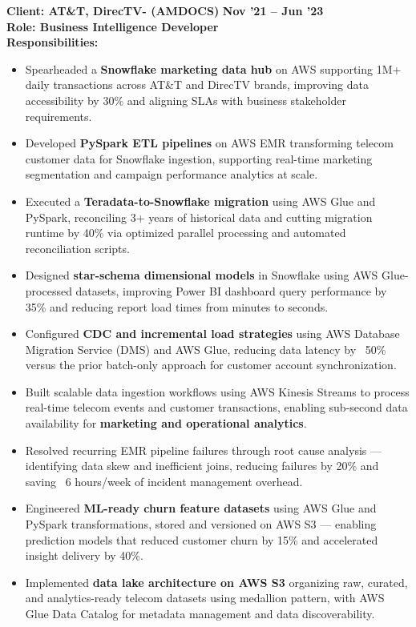 \documentclass[a4paper,10pt]{article}
\begin{document}
\vspace{0.5cm}
\textbf{Client: AT\&T, DirecTV- (AMDOCS)} \hfill \textbf{Nov '21 – Jun '23} \\
\textbf{Role: Business Intelligence Developer} \\
\textbf{Responsibilities:}
\begin{itemize}
    \item Spearheaded a \textbf{Snowflake marketing data hub} on AWS supporting 1M+ daily transactions across AT\&T and DirecTV brands, improving data accessibility by 30\% and aligning SLAs with business stakeholder requirements.
    \item Developed \textbf{PySpark ETL pipelines} on AWS EMR transforming telecom customer data for Snowflake ingestion, supporting real-time marketing segmentation and campaign performance analytics at scale.
    \item Executed a \textbf{Teradata-to-Snowflake migration} using AWS Glue and PySpark, reconciling 3+ years of historical data and cutting migration runtime by 40\% via optimized parallel processing and automated reconciliation scripts.
    \item Designed \textbf{star-schema dimensional models} in Snowflake using AWS Glue-processed datasets, improving Power BI dashboard query performance by 35\% and reducing report load times from minutes to seconds.
    \item Configured \textbf{CDC and incremental load strategies} using AWS Database Migration Service (DMS) and AWS Glue, reducing data latency by ~50\% versus the prior batch-only approach for customer account synchronization.
    \item Built scalable data ingestion workflows using AWS Kinesis Streams to process real-time telecom events and customer transactions, enabling sub-second data availability for \textbf{marketing and operational analytics}.
    \item Resolved recurring EMR pipeline failures through root cause analysis — identifying data skew and inefficient joins, reducing failures by 20\% and saving ~6 hours/week of incident management overhead.
    \item Engineered \textbf{ML-ready churn feature datasets} using AWS Glue and PySpark transformations, stored and versioned on AWS S3 — enabling prediction models that reduced customer churn by 15\% and accelerated insight delivery by 40\%.
    \item Implemented \textbf{data lake architecture on AWS S3} organizing raw, curated, and analytics-ready telecom datasets using medallion pattern, with AWS Glue Data Catalog for metadata management and data discoverability.
\end{itemize}
\end{document}
